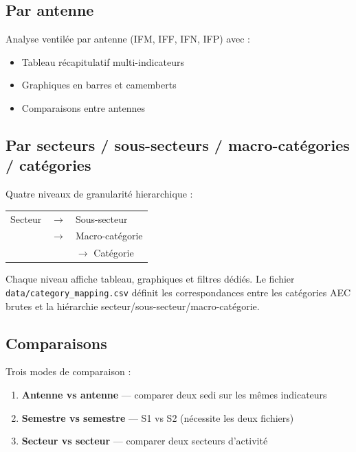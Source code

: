 \documentclass[12pt,a4paper,twoside]{article}
\begin{document}
\subsection{Par antenne}

Analyse ventil\'{e}e par antenne (IFM, IFF, IFN, IFP) avec :
\begin{itemize}[leftmargin=2em]
  \item Tableau r\'{e}capitulatif multi-indicateurs
  \item Graphiques en barres et camemberts
  \item Comparaisons entre antennes
\end{itemize}

\subsection{Par secteurs / sous-secteurs / macro-cat\'{e}gories / cat\'{e}gories}

Quatre niveaux de granularit\'{e} hierarchique :

\begin{center}
\begin{tabular}{lcl}
Secteur & $\rightarrow$ & Sous-secteur \\
 & $\rightarrow$ & Macro-cat\'{e}gorie \\
 & & \quad $\rightarrow$ Cat\'{e}gorie \\
\end{tabular}
\end{center}

Chaque niveau affiche tableau, graphiques et filtres d\'{e}di\'{e}s. Le fichier \texttt{data/category\_mapping.csv} d\'{e}finit les correspondances entre les cat\'{e}gories AEC brutes et la hi\'{e}rarchie secteur/sous-secteur/macro-cat\'{e}gorie.

\subsection{Comparaisons}

Trois modes de comparaison :
\begin{enumerate}[leftmargin=2em]
  \item \textbf{Antenne vs antenne} --- comparer deux sedi sur les m\^{e}mes indicateurs
  \item \textbf{Semestre vs semestre} --- S1 vs S2 (n\'{e}cessite les deux fichiers)
  \item \textbf{Secteur vs secteur} --- comparer deux secteurs d'activit\'{e}
\end{enumerate}
\end{document}
